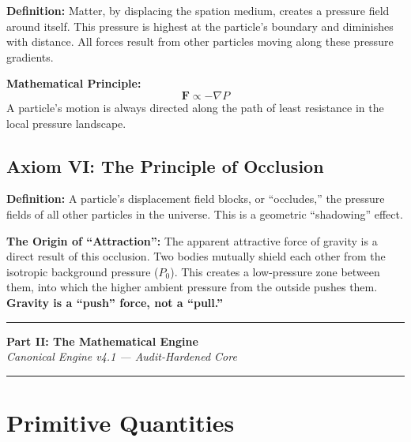 \textbf{Definition:} Matter, by displacing the spation medium, creates a pressure field around itself.  This pressure is highest at the particle's boundary and diminishes with distance.  All forces result from other particles moving along these pressure gradients.

\textbf{Mathematical Principle:}
\begin{equation}\label{eq:force-gradient}
  \mathbf{F} \propto -\nabla P
\end{equation}
A particle's motion is always directed along the path of least resistance in the local pressure landscape.

\subsection{Axiom VI: The Principle of Occlusion}

\textbf{Definition:} A particle's displacement field blocks, or ``occludes,'' the pressure fields of all other particles in the universe.  This is a geometric ``shadowing'' effect.

\textbf{The Origin of ``Attraction'':} The apparent attractive force of gravity is a direct result of this occlusion.  Two bodies mutually shield each other from the isotropic background pressure ($P_0$).  This creates a low-pressure zone between them, into which the higher ambient pressure from the outside pushes them.  \textbf{Gravity is a ``push'' force, not a ``pull.''}



\vspace{1cm}
\noindent\rule{\textwidth}{0.8pt}
\begin{center}
{\Large\bfseries Part II: The Mathematical Engine}\\[6pt]
{\itshape Canonical Engine v4.1 --- Audit-Hardened Core}
\end{center}
\noindent\rule{\textwidth}{0.8pt}
\vspace{0.5cm}


\section{Primitive Quantities}
\label{sec:primitives}

